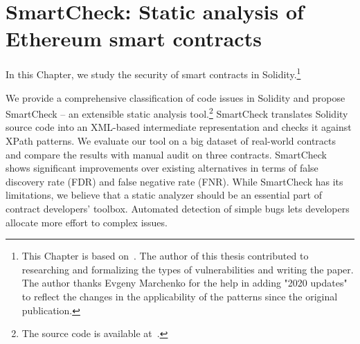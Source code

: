 \chapter{SmartCheck: Static analysis of Ethereum smart contracts}

\label{Chapter11SmartCheck}



In this Chapter, we study the security of smart contracts in Solidity.\footnote{This Chapter is based on~\cite{Tikhomirov2018}. The author of this thesis contributed to researching and formalizing the types of vulnerabilities and writing the paper. The author thanks Evgeny Marchenko for the help in adding "2020 updates" to reflect the changes in the applicability of the patterns since the original publication.}

We provide a comprehensive classification of code issues in Solidity and propose SmartCheck -- an extensible static analysis tool.\footnote{The source code is available at~\cite{SmartCheck}.}
SmartCheck translates Solidity source code into an XML-based intermediate representation and checks it against XPath patterns.
We evaluate our tool on a big dataset of real-world contracts and compare the results with manual audit on three contracts.
SmartCheck shows significant improvements over existing alternatives in terms of false discovery rate (FDR) and false negative rate (FNR).
While SmartCheck has its limitations, we believe that a static analyzer should be an essential part of contract developers' toolbox.
Automated detection of simple bugs lets developers allocate more effort to complex issues.










